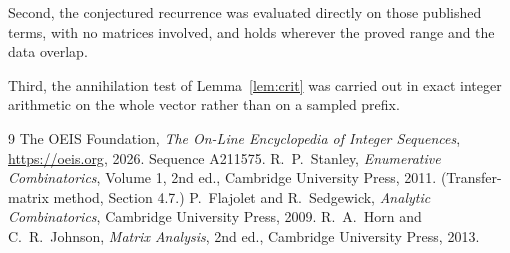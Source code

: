 \documentclass[11pt,a4paper]{article}
\theoremstyle{plain}
\theoremstyle{definition}
\begin{document}
Second, the conjectured recurrence was evaluated directly on those published terms, with no
matrices involved, and holds wherever the proved range and the data overlap.

Third, the annihilation test of Lemma~\ref{lem:crit} was carried out in exact integer
arithmetic on the whole vector rather than on a sampled prefix.

\begin{thebibliography}{9}
 The OEIS Foundation, \emph{The On-Line Encyclopedia of Integer
Sequences}, \url{https://oeis.org}, 2026. Sequence A211575.
 R.~P.~Stanley, \emph{Enumerative Combinatorics}, Volume 1, 2nd ed.,
Cambridge University Press, 2011. (Transfer-matrix method, Section 4.7.)
 P.~Flajolet and R.~Sedgewick, \emph{Analytic Combinatorics}, Cambridge
University Press, 2009.
 R.~A.~Horn and C.~R.~Johnson, \emph{Matrix Analysis}, 2nd ed., Cambridge
University Press, 2013.
\end{thebibliography}
\end{document}
